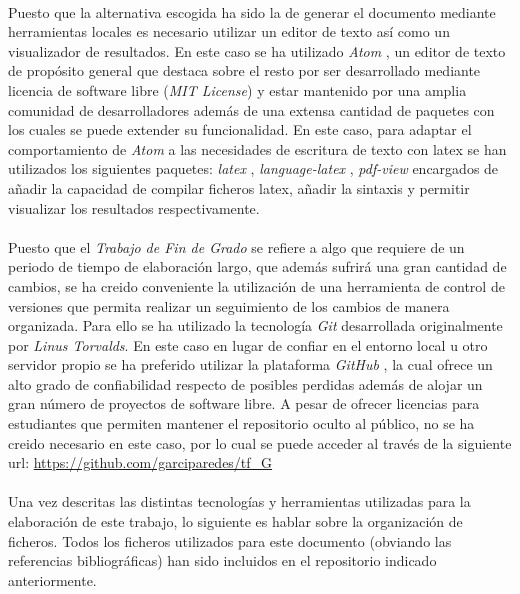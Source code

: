 \documentclass{subfiles}
\begin{document}
    \paragraph{}
    Puesto que la alternativa escogida ha sido la de generar el documento mediante herramientas locales es necesario utilizar un editor de texto así como un visualizador de resultados. En este caso se ha utilizado \emph{Atom} \cite{tool:atom}, un editor de texto de propósito general que destaca sobre el resto por ser desarrollado mediante licencia de software libre (\emph{MIT License}) y estar mantenido por una amplia comunidad de desarrolladores además de una extensa cantidad de paquetes con los cuales se puede extender su funcionalidad. En este caso, para adaptar el comportamiento de \emph{Atom} a las necesidades de escritura de texto con latex se han utilizados los siguientes paquetes: \emph{latex} \cite{tool:atom-latex}, \emph{language-latex} \cite{tool:atom-language-latex}, \emph{pdf-view} \cite{tool:atom-pdf-view} encargados de añadir la capacidad de compilar ficheros latex, añadir la sintaxis y permitir visualizar los resultados respectivamente.

    \paragraph{}
    Puesto que el \emph{Trabajo de Fin de Grado} se refiere a algo que requiere de un periodo de tiempo de elaboración largo, que además sufrirá una gran cantidad de cambios, se ha creido conveniente la utilización de una herramienta de control de versiones que permita realizar un seguimiento de los cambios de manera organizada. Para ello se ha utilizado la tecnología \emph{Git} \cite{tool:git} desarrollada originalmente por \emph{Linus Torvalds}. En este caso en lugar de confiar en el entorno local u otro servidor propio se ha preferido utilizar la plataforma \emph{GitHub} \cite{tool:github}, la cual ofrece un alto grado de confiabilidad respecto de posibles perdidas además de alojar un gran número de proyectos de software libre. A pesar de ofrecer licencias para estudiantes que permiten mantener el repositorio oculto al público, no se ha creido necesario en este caso, por lo cual se puede acceder al través de la siguiente url: \url{https://github.com/garciparedes/tf_G}

    \paragraph{}
    Una vez descritas las distintas tecnologías y herramientas utilizadas para la elaboración de este trabajo, lo siguiente es hablar sobre la organización de ficheros. Todos los ficheros utilizados para este documento (obviando las referencias bibliográficas) han sido incluidos en el repositorio indicado anteriormente.
\end{document}

